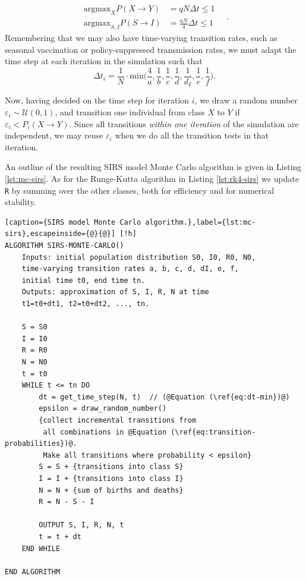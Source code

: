 \documentclass[]{article}
\begin{document}
\begin{equation}
\begin{aligned}
	\mathrm{argmax}_X  P(X \rightarrow Y) &= qN \Delta t \le 1 \\
	\mathrm{argmax}_{S,I} P(S \rightarrow I) &= \frac{aN}{4} \Delta t \le 1
\end{aligned} \quad .
\end{equation}
Remembering that we may also have time-varying transition rates, such as seasonal vaccination or policy-suppressed transmission rates, we must adapt the time step at each iteration in the simulation such that
\begin{equation} \label{eq:dt-min}
	\Delta t_i = \frac{1}{N} \cdot \mathrm{min} \bigg( \frac{4}{a}, \frac{1}{b}, \frac{1}{c}, \frac{1}{d}, \frac{1}{d_I}, \frac{1}{e}, \frac{1}{f} \bigg).
\end{equation}

Now, having decided on the time step for iteration $i$, we draw a random number $\varepsilon_i \sim \mathcal{U}(0,1)$, and transition one individual from class $X$ to $Y$ if $\varepsilon_i < P_i(X \rightarrow Y)$. Since all transitions \textit{within one iteration} of the simulation are independent, we may reuse $\varepsilon_i$ when we do all the transition tests in that iteration. 

An outline of the resulting SIRS model Monte Carlo algorithm is given in Listing \ref{lst:mc-sirs}. As for the Runge-Kutta algorithm in Listing \ref{lst:rk4-sirs} we update \lstinline|R| by summing over the other classes, both for efficiency and for numerical stability.

\begin{lstlisting}[caption={SIRS model Monte Carlo algorithm.},label={lst:mc-sirs},escapeinside={@}{@}] [!h]
ALGORITHM SIRS-MONTE-CARLO()
	Inputs: initial population distribution S0, I0, R0, N0,
	time-varying transition rates a, b, c, d, dI, e, f,
	initial time t0, end time tn.
	Outputs: approximation of S, I, R, N at time
	t1=t0+dt1, t2=t0+dt2, ..., tn.
	
	S = S0
	I = I0
	R = R0
	N = N0
	t = t0
	WHILE t <= tn DO
		dt = get_time_step(N, t)  // (@Equation (\ref{eq:dt-min})@)
		epsilon = draw_random_number()
		{collect incremental transitions from 
		 all combinations in @Equation (\ref{eq:transition-probabilities})@.
		 Make all transitions where probability < epsilon}
		S = S + {transitions into class S}
		I = I + {transitions into class I}
		N = N + {sum of births and deaths}
		R = N - S - I
		
		OUTPUT S, I, R, N, t
		t = t + dt
	END WHILE

END ALGORITHM
\end{lstlisting}
\end{document}
